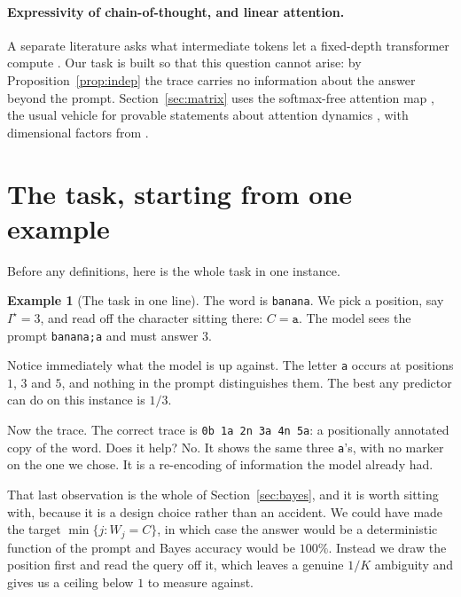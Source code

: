 \documentclass{article}
\theoremstyle{plain}
\theoremstyle{definition}
\newtheorem{example}{Example}
\theoremstyle{remark}
\newcommand{\1}{\mathbf{1}}
\begin{document}
\paragraph{Expressivity of chain-of-thought, and linear attention.}
A separate literature asks what intermediate tokens let a fixed-depth transformer
compute \citep{feng2023towards,merrill2024expressive,li2024chain}. Our task is
built so that this question cannot arise: by Proposition~\ref{prop:indep} the
trace carries no information about the answer beyond the prompt.
Section~\ref{sec:matrix} uses the softmax-free attention map
\citep{katharopoulos2020transformers}, the usual vehicle for provable statements
about attention dynamics \citep{vonoswald2023transformers,zhang2024incontext},
with dimensional factors from \citet{tropp2011freedman}.

\section{The task, starting from one example}
\label{sec:setup}

Before any definitions, here is the whole task in one instance.

\begin{example}[The task in one line]
\label{ex:instance}
The word is \texttt{banana}. We pick a position, say $I^\star=3$, and read off
the character sitting there: $C=\texttt{a}$. The model sees the prompt
\texttt{banana;a} and must answer $3$.

Notice immediately what the model is up against. The letter \texttt{a} occurs at
positions $1$, $3$ and $5$, and nothing in the prompt distinguishes them. The
best any predictor can do on this instance is $1/3$.

Now the trace. The correct trace is \texttt{0b 1a 2n 3a 4n 5a}: a positionally
annotated copy of the word. Does it help? No. It shows the same three
\texttt{a}'s, with no marker on the one we chose. It is a re-encoding of
information the model already had.
\end{example}

That last observation is the whole of Section~\ref{sec:bayes}, and it is worth
sitting with, because it is a design choice rather than an accident. We could
have made the target $\min\{j:W_j=C\}$, in which case the answer would be a
deterministic function of the prompt and Bayes accuracy would be $100\%$. Instead
we draw the position first and read the query off it, which leaves a genuine
$1/K$ ambiguity and gives us a ceiling below $1$ to measure against.
\end{document}

